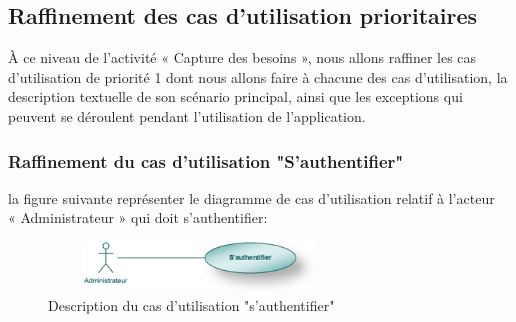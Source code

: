 \documentclass[12 pt]{report}
\begin{document}
\subsection{Raffinement des cas d’utilisation prioritaires}
À ce niveau de l’activité « Capture des besoins », nous allons raffiner les cas d'utilisation de priorité 1 dont nous allons faire à chacune des cas d'utilisation, la description textuelle de son scénario principal, ainsi que les exceptions qui peuvent se déroulent pendant l'utilisation de l’application.




\subsubsection{Raffinement du cas d'utilisation "S'authentifier"}
la figure suivante représenter le diagramme de cas d’utilisation  relatif à l’acteur \\« Administrateur » qui doit s'authentifier:
\begin{figure}[h]
\begin{center}
\includegraphics[width= 8cm , height = 1.3cm]{auth.png}
\caption{Description du cas d'utilisation "s'authentifier"}
\end{center}
\end{figure}
\end{document}
